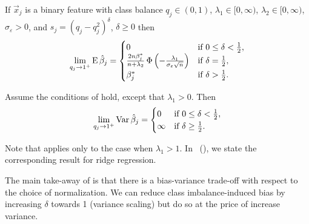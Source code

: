 \begin{theorem}
  \label{thm:classbalance-bias}
  If \(\vec{x}_j\) is a binary feature with class balance \(q_j \in (0, 1)\),
  \(\lambda_1 \in [0,\infty)\), \(\lambda_2 \in [0,\infty)\),
  \(\sigma_\varepsilon > 0\), and \(s_j = (q_j - q_j^2)^{\delta}\), \(\delta
  \geq 0\)  then
  \[
    \lim_{q_j \rightarrow 1^+} \operatorname{E} \hat{\beta}_j =
    \begin{cases}
      0                                                                                                  & \text{if } 0 \leq \delta < \frac{1}{2}, \\
      \frac{2n \beta_j^*}{n + \lambda_2} \operatorname{\Phi}\left(-\frac{\lambda_1}{\sigma_\varepsilon \sqrt{n}}\right) & \text{if } \delta = \frac{1}{2},        \\
      \beta^*_j                                                                                          & \text{if } \delta > \frac{1}{2}.
    \end{cases}
  \]
\end{theorem}

\begin{theorem}
  \label{thm:classbalance-variance}
  Assume the conditions of  hold, except that
  \(\lambda_1 > 0\). Then
  \[
    \lim_{q_j \rightarrow 1^+} \operatorname{Var} \hat{\beta}_j =
    \begin{cases}
      0      & \text{if } 0 \leq \delta < \frac{1}{2}, \\
      \infty & \text{if } \delta \geq \frac{1}{2}.
    \end{cases}
  \]
\end{theorem}

Note that  applies only to the case when \(\lambda_1 > 1\).
In ~(), we state the corresponding result
for ridge regression.

The main take-away of
 is that there is
a bias-variance trade-off with respect to the choice of normalization. We can reduce class
imbalance-induced bias by increasing \(\delta\) towards 1 (variance scaling) but do so at
the price of increase variance.


